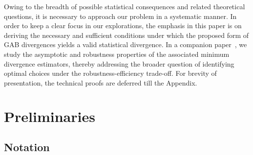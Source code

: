 \documentclass[11pt]{article}
\theoremstyle{plain}
\theoremstyle{remark}
\begin{document}
Owing to the breadth of possible statistical consequences and related theoretical questions, it is necessary to approach our problem in a systematic manner.  In order to keep a clear focus in our explorations, the emphasis in this paper is on deriving the necessary and sufficient conditions under which the proposed form of GAB divergences yields a valid statistical divergence. In a companion paper~\citep{roy2026gaboptimal}, we study the asymptotic and robustness properties of the associated minimum divergence estimators, thereby addressing the broader question of identifying optimal choices under the robustness-efficiency trade-off. For brevity of presentation, the technical proofs are deferred till the Appendix.

\section{Preliminaries}\label{sec:prelim}

\subsection{Notation}\label{sec:notation}
\end{document}
